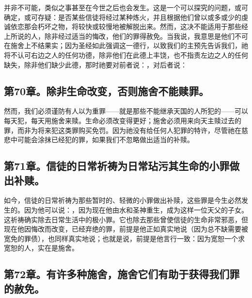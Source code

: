 并非不可能，类似之事甚至在今世之后也会发生。这是一个可以探究的问题，或可确定，或可存疑：是否某些信徒将经过某种炼火，并且根据他们曾以或多或少的虔诚依恋那会朽坏之物，将较快或较慢地被解脱出来。然而，这决不能适用于那些经上所说的人，除非经过适当的悔改，他们的罪得赦免。当我说，我意思是他们不可在施舍上不结果实；因为圣经如此强调这一德行，以致我们的主预先告诉我们，祂将不认可右边之人的任何功德，除非他们在此德上丰饶，也不指责左边之人的任何缺失，除非他们缺少此德，那时祂要对前者说：，对后者说：\par


\subsection{第70章。除非生命改变，否则施舍不能赎罪。}

然而，我们必须谨防有人以为重罪——就是那些不能继承天国的人所犯的——可以每天犯，每天用施舍来赎。生命必须改变得更好；施舍必须用来向天主赎过去的罪，而非为将来犯这类罪购买免罚。因为祂没有给任何人犯罪的特许，尽管祂在慈悲中可能会涂抹已经犯的罪，如果我们不忽略做出适当的补赎。\par


\subsection{第71章。信徒的日常祈祷为日常玷污其生命的小罪做出补赎。}

如今，信徒的日常祈祷为那些暂时的、轻微的小罪做出补赎，这些罪是今生必然发生的。因为他可以说：，因为现在他由水和圣神重生，成为这样一位天父的子女。这祈祷确实除去日常生活中的极小罪。它也除去那些曾使信徒的生命非常邪恶，但现在他因悔改而改变，已经弃绝的罪，前提是他正如真实地说（因为总不缺需要被宽免的罪债），也同样真实地说；也就是说，前提是他言行一致：因为宽恕一个求宽恕的人，实在是施舍。\par


\subsection{第72章。有许多种施舍，施舍它们有助于获得我们罪的赦免。}

